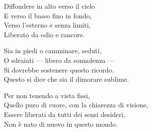 Diffondere in alto verso il cielo\\
E verso il basso fino in fondo,\\
Verso l'esterno e senza limiti,\\
Liberato da odio e rancore.

Sia in piedi o camminare, seduti,\\
O sdraiati --- libero da sonnolenza ---\\
Si dovrebbe sostenere questo ricordo.\\
Questo si dice che sia il dimorare sublime.

Per non tenendo a vista fissi,\\
Quello puro di cuore, con la chiarezza di visione,\\
Essere liberati da tutti dei sensi desideri,\\
Non è nato di nuovo in questo mondo.

